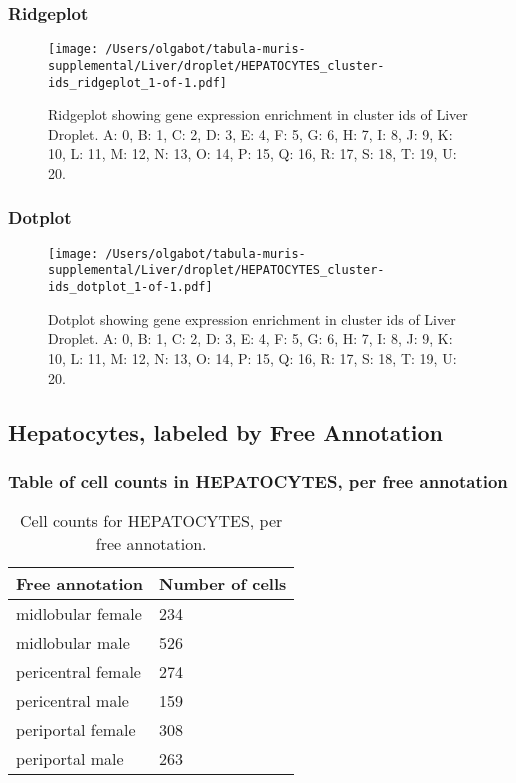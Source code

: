 \newpage
\newpage
\subsubsection{Ridgeplot}
\begin{figure}[h]
\centering
\texttt{[image: /Users/olgabot/tabula-muris-supplemental/Liver/droplet/HEPATOCYTES\_cluster-ids\_ridgeplot\_1-of-1.pdf]}

\caption{ Ridgeplot  showing gene expression enrichment in cluster ids of Liver Droplet. A: 0, B: 1, C: 2, D: 3, E: 4, F: 5, G: 6, H: 7, I: 8, J: 9, K: 10, L: 11, M: 12, N: 13, O: 14, P: 15, Q: 16, R: 17, S: 18, T: 19, U: 20.}
\end{figure}


\newpage
\newpage
\subsubsection{Dotplot}
\begin{figure}[h]
\centering
\texttt{[image: /Users/olgabot/tabula-muris-supplemental/Liver/droplet/HEPATOCYTES\_cluster-ids\_dotplot\_1-of-1.pdf]}

\caption{ Dotplot  showing gene expression enrichment in cluster ids of Liver Droplet. A: 0, B: 1, C: 2, D: 3, E: 4, F: 5, G: 6, H: 7, I: 8, J: 9, K: 10, L: 11, M: 12, N: 13, O: 14, P: 15, Q: 16, R: 17, S: 18, T: 19, U: 20.}
\end{figure}


\newpage
\subsection{Hepatocytes, labeled by Free Annotation}
\subsubsection{Table of cell counts in HEPATOCYTES, per free annotation}\begin{table}[h]
\centering
\label{my-label}
\begin{tabular}{@{}ll@{}}
\toprule

Free annotation& Number of cells \\ \midrule
midlobular female & 234 \\

midlobular male & 526 \\

pericentral female & 274 \\

pericentral male & 159 \\

periportal female & 308 \\

periportal male & 263 \\
\bottomrule
\end{tabular}
\caption{Cell counts for HEPATOCYTES, per free annotation.}
\end{table}

